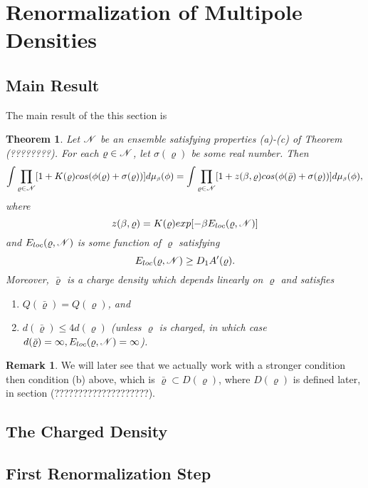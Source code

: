 \documentclass[11pt,reqno]{article}
\newtheorem{thm}{Theorem}[section]
\theoremstyle{definition}
\newtheorem*{remark}{Remark}
\numberwithin{equation}{section}
\begin{document}
\section{Renormalization of Multipole Densities}\label{sec:chap4}



\subsection{Main Result}
The main result of the this section is
\begin{thm} \label{thm:thm41}
Let $\mathscr{N}$ be an ensemble satisfying properties (a)-(c) of Theorem (????????). For each $\varrho \in \mathscr{N}$, let $\sigma(\varrho)$ be some real number. Then
\begin{equation}
\int\prod_{\varrho \in \mathscr{N}}[1 + K(\varrho)cos(\phi(\varrho) + \sigma(\varrho))]d\mu_{\text{\tiny$\beta$}}(\phi) = 
\int\prod_{\varrho \in \mathscr{N}}[1 + z(\beta,\varrho)cos(\phi(\bar{\varrho}) + \sigma(\varrho))]d\mu_{\text{\tiny$\beta$}}(\phi), 
\end{equation}
where
$$
z(\beta,\varrho) = K(\varrho)exp[-\beta E_{loc}(\varrho, \mathscr{N})]
$$
and $E_{loc}(\varrho, \mathscr{N})$ is some function of $\varrho$ satisfying 
\begin{equation}
E_{loc}(\varrho, \mathscr{N}) \geq D_1 A^\prime(\varrho).
\end{equation}
Moreover, $\bar{\varrho}$ is a charge density which depends linearly on $\varrho$ and satisfies
\begin{enumerate}[label={\alph*)}]
\item $Q(\bar{\varrho}) = Q(\varrho)$, and
\item $d(\bar{\varrho}) \leq 4d(\varrho)$ (unless $\varrho$ is charged, in which case $d(\bar{\varrho}) = \infty, E_{loc}(\varrho, \mathscr{N}) = \infty$).
\end{enumerate}
\end{thm}
\begin{remark}
We will later see that we actually work with a stronger condition then condition (b) above,  which is $\bar{\varrho} \subset D(\varrho)$, where $D(\varrho)$ is defined later, in section (????????????????????).
\end{remark}

\subsection{The Charged Density}

\subsection{First Renormalization Step}
\end{document}
